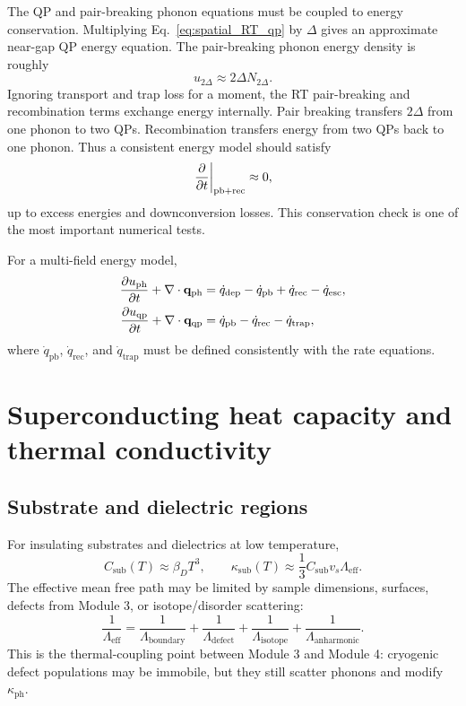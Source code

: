 \documentclass[11pt]{article}
\newcommand{\kappaph}{\kappa_{\mathrm{ph}}}
\newcommand{\nqp}{n_{\mathrm{qp}}}
\newcommand{\Npb}{N_{2\Delta}}
\newcommand{\qdep}{\dot q_{\mathrm{dep}}}
\newcommand{\qpb}{\dot q_{\mathrm{pb}}}
\newcommand{\qrec}{\dot q_{\mathrm{rec}}}
\newcommand{\qesc}{\dot q_{\mathrm{esc}}}
\newcommand{\qtrap}{\dot q_{\mathrm{trap}}}
\renewcommand{\mfp}{\Lambda}
\newcommand{\Jph}{\mathbf{q}_{\mathrm{ph}}}
\newcommand{\Jqp}{\mathbf{q}_{\mathrm{qp}}}
\begin{document}
The QP and pair-breaking phonon equations must be coupled to energy conservation. Multiplying Eq.~\eqref{eq:spatial_RT_qp} by \(\Delta\) gives an approximate near-gap QP energy equation. The pair-breaking phonon energy density is roughly
\begin{equation}
u_{2\Delta}\approx 2\Delta \Npb.
\end{equation}
Ignoring transport and trap loss for a moment, the RT pair-breaking and recombination terms exchange energy internally. Pair breaking transfers \(2\Delta\) from one phonon to two QPs. Recombination transfers energy from two QPs back to one phonon. Thus a consistent energy model should satisfy
\begin{equation}
\left.\pdv{}{t}(\Delta\nqp+2\Delta\Npb)\right|_{\mathrm{pb+rec}}
\approx 0,
\end{equation}
up to excess energies and downconversion losses. This conservation check is one of the most important numerical tests.

For a multi-field energy model,
\begin{align}
\pdv{u_{\mathrm{ph}}}{t} + \nabla\cdot\Jph
&= \qdep - \qpb + \qrec -\qesc,\\
\pdv{u_{\mathrm{qp}}}{t} + \nabla\cdot\Jqp
&= \qpb - \qrec - \qtrap,
\end{align}
where \(\qpb\), \(\qrec\), and \(\qtrap\) must be defined consistently with the rate equations.

\section{Superconducting heat capacity and thermal conductivity}

\subsection{Substrate and dielectric regions}

For insulating substrates and dielectrics at low temperature,
\begin{equation}
C_{\mathrm{sub}}(T)\approx \beta_D T^3,
\qquad
\kappa_{\mathrm{sub}}(T)\approx \frac{1}{3}C_{\mathrm{sub}}v_s\mfp_{\mathrm{eff}}.
\end{equation}
The effective mean free path may be limited by sample dimensions, surfaces, defects from Module 3, or isotope/disorder scattering:
\begin{equation}
\frac{1}{\mfp_{\mathrm{eff}}}
=\frac{1}{\mfp_{\mathrm{boundary}}}
+\frac{1}{\mfp_{\mathrm{defect}}}
+\frac{1}{\mfp_{\mathrm{isotope}}}
+\frac{1}{\mfp_{\mathrm{anharmonic}}}.
\label{eq:matthiessen_ph}
\end{equation}
This is the thermal-coupling point between Module 3 and Module 4: cryogenic defect populations may be immobile, but they still scatter phonons and modify \(\kappaph\).
\end{document}
